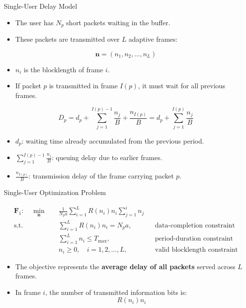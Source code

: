 \documentclass{beamer}
\begin{document}
\begin{frame}{Single-User Delay Model}
\small

\begin{itemize}
    \item The user has $N_p$ short packets waiting in the buffer.
    \item These packets are transmitted over $L$ adaptive frames:
\end{itemize}

\[
\mathbf{n}=(n_1,n_2,\ldots,n_L)
\]

\begin{itemize}
    \item $n_i$ is the blocklength of frame $i$.
    \item If packet $p$ is transmitted in frame $I(p)$, it must wait for all previous frames.
\end{itemize}

\[
D_p
=
d_p
+
\sum_{j=1}^{I(p)-1} \frac{n_j}{B}
+
\frac{n_{I(p)}}{B}
=
d_p+\sum_{j=1}^{I(p)}\frac{n_j}{B}
\]

\begin{itemize}
    \item $d_p$: waiting time already accumulated from the previous period.
    \item $\sum_{j=1}^{I(p)-1}\frac{n_j}{B}$: queuing delay due to earlier frames.
    \item $\frac{n_{I(p)}}{B}$: transmission delay of the frame carrying packet $p$.
\end{itemize}

\end{frame}

\begin{frame}{Single-User Optimization Problem}
\small

\[
\begin{aligned}
\mathbf{F}_1:\quad
\min_{\mathbf{n}} \quad
& \frac{1}{N_p a}
\sum_{i=1}^{L}
R(n_i)n_i
\sum_{j=1}^{i} n_j \\[0.2cm]
\text{s.t.}\quad
& \sum_{i=1}^{L} R(n_i)n_i = N_p a,
&& \text{data-completion constraint} \\[0.1cm]
& \sum_{i=1}^{L} n_i \leq T_{\max},
&& \text{period-duration constraint} \\[0.1cm]
& n_i \geq 0,\quad i=1,2,\ldots,L,
&& \text{valid blocklength constraint}
\end{aligned}
\]

\begin{itemize}
    \item The objective represents the \textbf{average delay of all packets} served across $L$ frames.

    \item In frame $i$, the number of transmitted information bits is:
    \[
    R(n_i)n_i
    \]
\end{itemize}

\end{frame}
\end{document}
